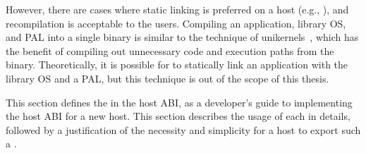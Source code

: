 However, there are cases where static linking is preferred on a host (e.g., \sgx{}), and recompilation is acceptable to the users.
Compiling an application, library OS, and PAL
into a single binary is similar to the technique of unikernels~\cite{unikernels},
which has the benefit of compiling out unnecessary code and execution paths
from the binary. 
Theoretically, it is possible for \graphene{} to statically link an application with the library OS and a PAL,
but this technique is out of the scope of this thesis.



This section defines the \hostapis{}
in the host ABI,
as a developer's guide to implementing the host ABI for a new host.
This section describes 
the usage of each \hostapi{} in details,
followed by a justification of the necessity and simplicity
for a host to export such a \hostapi{}.


